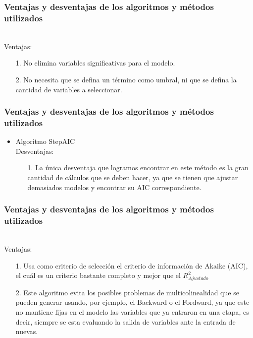 \documentclass[12pt]{beamer}
\begin{document}
\begin{frame}
\frametitle{Ventajas y desventajas de los algoritmos y métodos utilizados}
~\\ Ventajas:
\begin{itemize}
\item[1.] No elimina variables significativas para el modelo.
\item[2.] No necesita que se defina un término como umbral, ni que se defina la cantidad de variables a seleccionar.
\end{itemize}
\end{frame}

\begin{frame}
\frametitle{Ventajas y desventajas de los algoritmos y métodos utilizados}
\begin{itemize}
\item Algoritmo StepAIC
~\\ Desventajas:
\begin{itemize}
\item[1.] La única desventaja que logramos encontrar en este método es la gran cantidad de cálculos que se deben hacer, ya que se tienen que ajustar demasiados modelos y encontrar su AIC correspondiente.
\end{itemize}
\end{itemize}
\end{frame}

\begin{frame}
\frametitle{Ventajas y desventajas de los algoritmos y métodos utilizados}
~\\ Ventajas:
\begin{itemize}
\item[1.] Usa como criterio de selección el criterio de información de Akaike (AIC), el cuál es un criterio bastante completo y mejor que el $R^2_{Ajustado}$
\item[2.] Este algoritmo evita los posibles problemas de multicolinealidad que se pueden generar usando, por ejemplo, el Backward o el Fordward, ya que este no mantiene fijas en el modelo las variables que ya entraron en una etapa, es decir, siempre se esta evaluando la salida de variables ante la entrada de nuevas.
\end{itemize}
\end{frame}
\end{document}
